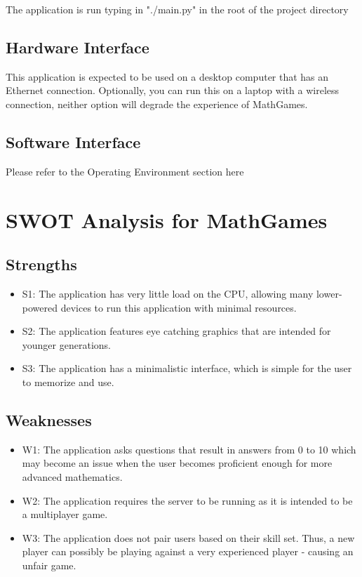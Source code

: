 \documentclass[12pt]{article}
\begin{document}
The application is run typing in "./main.py" in the root of the project directory

\subsection{Hardware Interface}

This application is expected to be used on a desktop computer that has an Ethernet connection.
Optionally, you can run this on a laptop with a wireless connection, neither option will degrade the experience of MathGames.

\subsection{Software Interface}

Please refer to the Operating Environment section here \underline{}

\newpage

\section{SWOT Analysis for MathGames}

\subsection{Strengths}

\begin{itemize}
\item S1: The application has very little load on the CPU, allowing many lower-powered devices to run this application with minimal resources.
\item S2: The application features eye catching graphics that are intended for younger generations.
\item S3: The application has a minimalistic interface, which is simple for the user to memorize and use.
\end{itemize}

\subsection{Weaknesses}

\begin{itemize}
\item W1: The application asks questions that result in answers from 0 to 10 which may become an issue when the user becomes proficient enough for more advanced mathematics.
\item W2: The application requires the server to be running as it is intended to be a multiplayer game.
\item W3: The application does not pair users based on their skill set. Thus, a new player can possibly be playing against a very experienced player - causing an unfair game.
\end{itemize}
\end{document}
